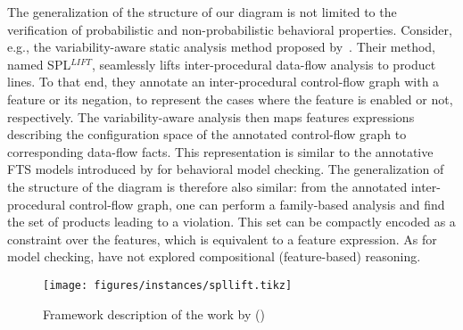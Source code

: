 The generalization of the structure of our diagram is  not limited to the verification of 
probabilistic and non-probabilistic behavioral properties. Consider, e.g., the variability-aware static analysis method proposed by~\citet{SPLLift}. Their method, named SPL$^{LIFT}$, seamlessly 
lifts inter-procedural data-flow analysis to product lines. To that end, they annotate an inter-procedural control-flow graph with a feature or its negation, to represent the cases where the feature is enabled or not, 
respectively. The variability-aware analysis then maps features expressions describing the configuration space of the annotated control-flow graph to corresponding data-flow facts.
This representation is similar to the annotative FTS 
models introduced by \citet{Classen2013} for behavioral model checking. 
The generalization of the structure of the diagram is therefore also similar: from the annotated inter-procedural control-flow graph, 
one can perform a family-based analysis and find the set of products leading to a violation. 
This set can be compactly encoded as a constraint over the features, which is equivalent to a feature 
expression. As \citet{Classen2013} for model checking, \citet{SPLLift} have not explored compositional 
(feature-based) reasoning.

\begin{figure}[!htbp]
	\centering
        \texttt{[image: figures/instances/spllift.tikz]}
	\caption{Framework description of the work by \citet{SPLLift} ()}
	\label{fig:instance-spllift}
\end{figure}

